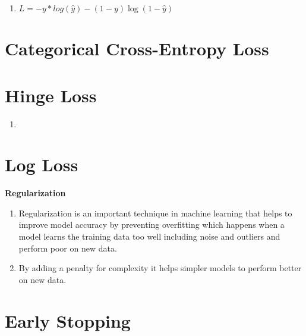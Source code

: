 \begin{enumerate}
    \item[]
    $
        L = -y * log(\hat{y}) - (1 - y)  \log(1 - \hat{y})
    $
    \hfill \cite{datacamp/tutorial/loss-function-in-machine-learning}
\end{enumerate}

\section{Categorical Cross-Entropy Loss}

\section{Hinge Loss}

\begin{enumerate}
    \item
\end{enumerate}


\section{Log Loss}




\clearpage
{\centering\fontsize{22}{22}\selectfont\bfseries Regularization \par}
\vspace{0.5cm}


\begin{enumerate}
    \item Regularization is an important technique in machine learning that helps to improve model accuracy by preventing overfitting which happens when a model learns the training data too well including noise and outliers and perform poor on new data.
    \hfill \cite{geeksforgeeks/machine-learning/regularization-in-machine-learning}

    \item By adding a penalty for complexity it helps simpler models to perform better on new data.
    \hfill \cite{geeksforgeeks/machine-learning/regularization-in-machine-learning}
\end{enumerate}




\section{Early Stopping}

